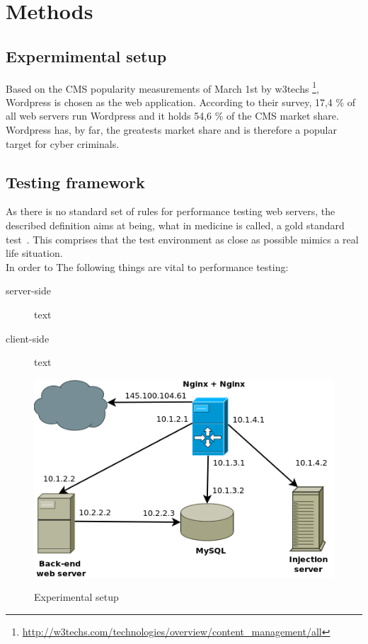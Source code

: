 \documentclass[Methods]{subfiles}
\begin{document}
\section{Methods}
\label{sec:Methods}

\subsection{Expermimental setup}
Based on the \ac{CMS} popularity measurements of March 1st by w3techs \footnote{\url{http://w3techs.com/technologies/overview/content_management/all}}, Wordpress is chosen as the web application. According to their survey, 17,4 \% of all web servers run Wordpress and it holds 54,6 \% of the CMS market share. Wordpress has, by far, the greatests market share and is therefore a popular target for cyber criminals.

\subsection{Testing framework}
As there is no standard set of rules for performance testing web servers, the described definition aims at being, what in medicine is called, a gold standard test~\cite{wacholder1993validation}. This comprises that the test environment as close as possible mimics a real life situation. \\ 
In order to The following things are vital to performance testing:

\begin{description} 
 \item[server-side] text 
 \item[client-side] text
\end{description}

\begin{figure}[h]
\caption{Experimental setup}
\centering
\includegraphics[scale=0.4] {images/infrastructure.png}
\label{fig:Experimental setup}
\end{figure}
\end{document}
